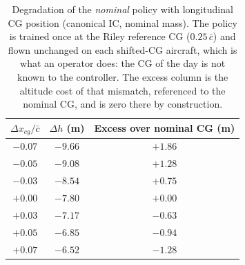 \begin{table}[H]
    \centering
    \caption{Degradation of the \emph{nominal} policy with longitudinal CG position (canonical IC, nominal mass). The policy is trained once at the Riley reference CG ($0.25\,\bar{c}$) and flown unchanged on each shifted-CG aircraft, which is what an operator does: the CG of the day is not known to the controller. The excess column is the altitude cost of that mismatch, referenced to the nominal CG, and is zero there by construction.}
    \label{tab:robustness_cg}
    \begin{tabular}{c c c}
        \toprule
        $\Delta x_{cg}/\bar{c}$ & $\Delta h$ (m) & Excess over nominal CG (m) \\
        \midrule
        $-0.07$ & $-9.66$ & $+1.86$ \\
        $-0.05$ & $-9.08$ & $+1.28$ \\
        $-0.03$ & $-8.54$ & $+0.75$ \\
        $+0.00$ & $-7.80$ & $+0.00$ \\
        $+0.03$ & $-7.17$ & $-0.63$ \\
        $+0.05$ & $-6.85$ & $-0.94$ \\
        $+0.07$ & $-6.52$ & $-1.28$ \\
        \bottomrule
    \end{tabular}
\end{table}

